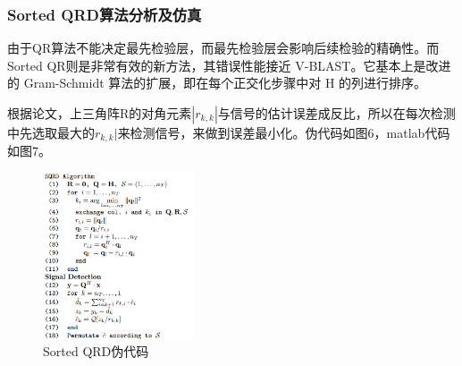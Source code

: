 \documentclass[a4paper,12pt]{article}
\begin{document}
	\subsubsection{Sorted QRD算法分析及仿真}
	由于QR算法不能决定最先检验层，而最先检验层会影响后续检验的精确性。而Sorted QR则是非常有效的新方法，其错误性能接近 V-BLAST。它基本上是改进的 Gram-Schmidt 算法的扩展，即在每个正交化步骤中对 H 的列进行排序。\par 
	根据论文，上三角阵R的对角元素$|r_{k,k}|$与信号的估计误差成反比，所以在每次检测中先选取最大的$r_{k,k}|$来检测信号，来做到误差最小化。伪代码如图6，matlab代码如图7。
	\begin{figure}
		\centering
		\includegraphics[width=0.4\textwidth]{5.png}
		\caption{Sorted QRD伪代码}
	\end{figure}
\end{document}

